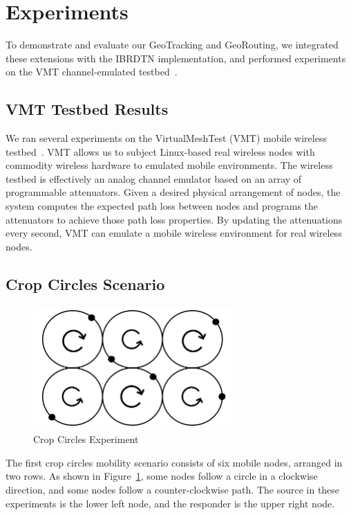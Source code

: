\section{Experiments}\label{sec:experiments}
To demonstrate and evaluate our GeoTracking and GeoRouting, 
we integrated these extensions with the IBRDTN implementation, and performed experiments on 
the VMT channel-emulated testbed~\cite{hahn10:using, kim11:reality}.  

\subsection{VMT Testbed Results}\label{sec:vmtresults}
We ran several experiments on the VirtualMeshTest (VMT)
mobile wireless testbed~\cite{hahn10:using, kim11:reality}.
VMT allows us to subject Linux-based real wireless nodes with commodity 
wireless hardware to emulated mobile environments.  The 
wireless testbed is effectively an analog channel emulator based
on an array of programmable attenuators.  Given a desired physical arrangement
of nodes, the system computes the expected path loss between
nodes and programs the attenuators to achieve those path loss
properties.  By updating the attenuations every second, VMT can
emulate a mobile wireless environment for real wireless nodes.

\subsection{Crop Circles Scenario}



\begin{figure}
\vspace{-.2cm}
\begin{center}
\includegraphics[width=3in]{figures/cropcircle1.png}
\end{center}
\vspace{-.4cm}
\caption{Crop Circles Experiment}\label{fig:cropcircle1}
\vspace{-.35cm}
\end{figure}

The first crop circles mobility scenario consists of six mobile nodes, arranged in two rows. As shown in 
Figure~\ref{fig:cropcircle1}, some nodes follow a circle in a clockwise direction, and some nodes follow a counter-clockwise path. The source in these experiments is the lower left node, and the responder is the upper right node.



